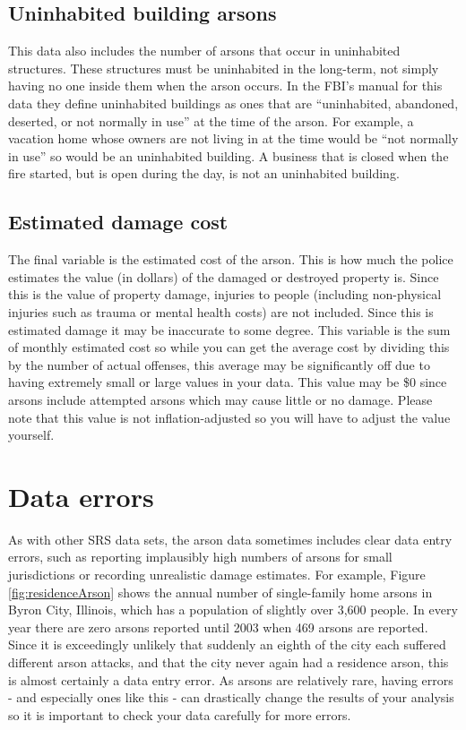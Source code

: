 \documentclass[
]{krantz}
\begin{document}
\subsection{Uninhabited building
arsons}\label{uninhabited-building-arsons}

This data also includes the number of arsons that occur in
uninhabited structures. These structures must be uninhabited
in the long-term, not simply having no one inside them when
the arson occurs. In the FBI's manual for this data they
define uninhabited buildings as ones that are ``uninhabited,
abandoned, deserted, or not normally in use'' at the time of
the arson. For example, a vacation home whose owners are not
living in at the time would be ``not normally in use'' so
would be an uninhabited building. A business that is closed
when the fire started, but is open during the day, is not an
uninhabited building.

\subsection{Estimated damage
cost}\label{estimated-damage-cost}

The final variable is the estimated cost of the arson. This
is how much the police estimates the value (in dollars) of
the damaged or destroyed property is. Since this is the
value of property damage, injuries to people (including
non-physical injuries such as trauma or mental health costs)
are not included. Since this is estimated damage it may be
inaccurate to some degree. This variable is the sum of
monthly estimated cost so while you can get the average cost
by dividing this by the number of actual offenses, this
average may be significantly off due to having extremely
small or large values in your data. This value may be \$0
since arsons include attempted arsons which may cause little
or no damage. Please note that this value is not
inflation-adjusted so you will have to adjust the value
yourself.

\section{Data errors}\label{data-errors-1}

As with other SRS data sets, the arson data sometimes
includes clear data entry errors, such as reporting
implausibly high numbers of arsons for small jurisdictions
or recording unrealistic damage estimates. For example,
Figure \ref{fig:residenceArson} shows the annual number of
single-family home arsons in Byron City, Illinois, which has
a population of slightly over 3,600 people. In every year
there are zero arsons reported until 2003 when 469 arsons
are reported. Since it is exceedingly unlikely that suddenly
an eighth of the city each suffered different arson attacks,
and that the city never again had a residence arson, this is
almost certainly a data entry error. As arsons are
relatively rare, having errors - and especially ones like
this - can drastically change the results of your analysis
so it is important to check your data carefully for more
errors.
\end{document}
